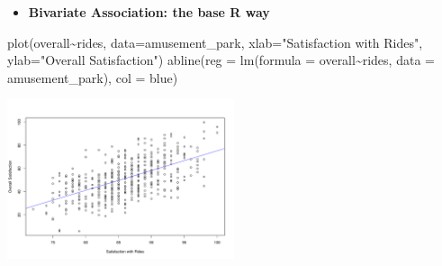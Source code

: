 \documentclass[
  ignorenonframetext,
]{beamer}
\newenvironment{Shaded}{\begin{snugshade}}{\end{snugshade}}
\newcommand{\AttributeTok}[1]{\textcolor[rgb]{0.40,0.45,0.13}{#1}}
\newcommand{\FunctionTok}[1]{\textcolor[rgb]{0.28,0.35,0.67}{#1}}
\newcommand{\NormalTok}[1]{\textcolor[rgb]{0.00,0.23,0.31}{#1}}
\newcommand{\SpecialCharTok}[1]{\textcolor[rgb]{0.37,0.37,0.37}{#1}}
\newcommand{\StringTok}[1]{\textcolor[rgb]{0.13,0.47,0.30}{#1}}
\providecommand{\tightlist}{%
  \setlength{\itemsep}{0pt}\setlength{\parskip}{0pt}}\usepackage{longtable,booktabs,array}
\begin{document}
\begin{frame}[fragile]{}
\label{section-8}
\begin{itemize}
\tightlist
\item
  \textbf{Bivariate Association: the base R way}
\end{itemize}

\tiny

\begin{Shaded}
\begin{Highlighting}[]
\FunctionTok{plot}\NormalTok{(overall}\SpecialCharTok{\textasciitilde{}}\NormalTok{rides, }\AttributeTok{data=}\NormalTok{amusement\_park,}
     \AttributeTok{xlab=}\StringTok{"Satisfaction with Rides"}\NormalTok{, }\AttributeTok{ylab=}\StringTok{"Overall Satisfaction"}\NormalTok{)}
\FunctionTok{abline}\NormalTok{(}\AttributeTok{reg =} \FunctionTok{lm}\NormalTok{(}\AttributeTok{formula =}\NormalTok{ overall}\SpecialCharTok{\textasciitilde{}}\NormalTok{rides, }\AttributeTok{data =}\NormalTok{ amusement\_park), }
       \AttributeTok{col =} \StringTok{\textquotesingle{}blue\textquotesingle{}}\NormalTok{)}
\end{Highlighting}
\end{Shaded}

\begin{center}
\includegraphics[width=0.5\textwidth,height=\textheight]{007_identifying_drivers_of_outcomes_linear_models_files/figure-beamer/unnamed-chunk-7-1.pdf}
\end{center}
\end{frame}
\end{document}
